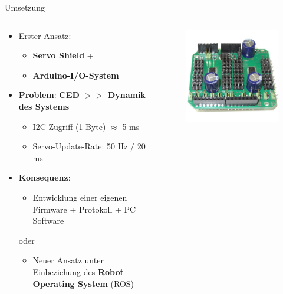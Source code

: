 \documentclass{beamer}
\begin{document}
\begin{frame}{Umsetzung}
\begin{columns}
	\begin{column}{0.7\textwidth}
\begin{itemize}
	\item Erster Ansatz:
	\begin{itemize}
		\item \textbf{Servo Shield} +
		\item \textbf{Arduino-I/O-System}
	\end{itemize}
\end{itemize}
\begin{itemize}
	\item \textbf{Problem}: \textbf{CED $>>$ Dynamik des Systems} 
	\begin{itemize}
		\item I2C Zugriff (1 Byte) $\approx$ 5 ms
		\item Servo-Update-Rate: 50 Hz / 20 ms
	\end{itemize} 
\end{itemize}
\begin{itemize}
	\item \textbf{Konsequenz}:
	\begin{itemize}
		\item Entwicklung einer eigenen Firmware + Protokoll + PC Software
	\end{itemize}
	\begin{large}oder\end{large}
	\begin{itemize}
	\item Neuer Ansatz unter Einbeziehung des \textbf{Robot Operating System} (ROS)
	\end{itemize}
\end{itemize}
	\end{column}
	\begin{column}{0.3\textwidth}
		\begin{figure}[H]
			\centering
			\includegraphics[width=1.0\textwidth]{./images/servo-shield.jpg}

\end{figure}
\end{column}
\end{columns}
\end{frame}
\end{document}
